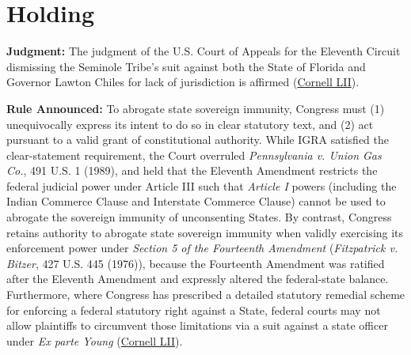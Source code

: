 \documentclass[12pt]{article}
\begin{document}
\section{Holding}

\textbf{Judgment:} The judgment of the U.S. Court of Appeals for the Eleventh Circuit dismissing the Seminole Tribe's suit against both the State of Florida and Governor Lawton Chiles for lack of jurisdiction is affirmed (\href{https://www.law.cornell.edu/supct/html/94-12.ZO.html}{Cornell LII}).

\textbf{Rule Announced:} To abrogate state sovereign immunity, Congress must (1) unequivocally express its intent to do so in clear statutory text, and (2) act pursuant to a valid grant of constitutional authority. While IGRA satisfied the clear-statement requirement, the Court overruled \textit{Pennsylvania v. Union Gas Co.}, 491 U.S. 1 (1989), and held that the Eleventh Amendment restricts the federal judicial power under Article III such that \textit{Article I} powers (including the Indian Commerce Clause and Interstate Commerce Clause) cannot be used to abrogate the sovereign immunity of unconsenting States. By contrast, Congress retains authority to abrogate state sovereign immunity when validly exercising its enforcement power under \textit{Section 5 of the Fourteenth Amendment} (\textit{Fitzpatrick v. Bitzer}, 427 U.S. 445 (1976)), because the Fourteenth Amendment was ratified after the Eleventh Amendment and expressly altered the federal-state balance. Furthermore, where Congress has prescribed a detailed statutory remedial scheme for enforcing a federal statutory right against a State, federal courts may not allow plaintiffs to circumvent those limitations via a suit against a state officer under \textit{Ex parte Young} (\href{https://www.law.cornell.edu/supct/html/94-12.ZO.html}{Cornell LII}).
\end{document}
